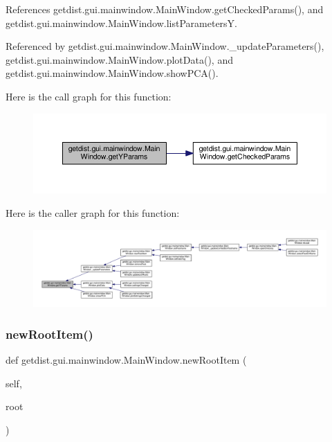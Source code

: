 References getdist.\+gui.\+mainwindow.\+Main\+Window.\+get\+Checked\+Params(), and getdist.\+gui.\+mainwindow.\+Main\+Window.\+list\+ParametersY.



Referenced by getdist.\+gui.\+mainwindow.\+Main\+Window.\+\_\+update\+Parameters(), getdist.\+gui.\+mainwindow.\+Main\+Window.\+plot\+Data(), and getdist.\+gui.\+mainwindow.\+Main\+Window.\+show\+P\+C\+A().

Here is the call graph for this function\+:
\nopagebreak
\begin{figure}[H]
\begin{center}
\leavevmode
\includegraphics[width=350pt]{classgetdist_1_1gui_1_1mainwindow_1_1MainWindow_a5a49bcf9798a91781b81e59086d05e61_cgraph}
\end{center}
\end{figure}
Here is the caller graph for this function\+:
\nopagebreak
\begin{figure}[H]
\begin{center}
\leavevmode
\includegraphics[width=350pt]{classgetdist_1_1gui_1_1mainwindow_1_1MainWindow_a5a49bcf9798a91781b81e59086d05e61_icgraph}
\end{center}
\end{figure}
\mbox{\label{classgetdist_1_1gui_1_1mainwindow_1_1MainWindow_acffec8bd5390cacd428e909ef4cfa449}} 
\subsubsection{\texorpdfstring{new\+Root\+Item()}{newRootItem()}}
{\footnotesize\ttfamily def getdist.\+gui.\+mainwindow.\+Main\+Window.\+new\+Root\+Item (\begin{DoxyParamCaption}\item[{}]{self,  }\item[{}]{root }\end{DoxyParamCaption})}




